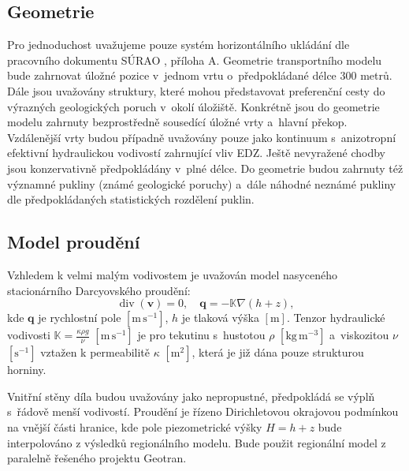 \documentclass{article}
\def\unit#1{\mathrm{#1}}
\def\grad{\nabla}
\def\div{\operatorname{div}}
\def\vc#1{\mathbf{\boldsymbol{#1}}}     %
\def\tn#1{{\mathbb{#1}}}    %
\begin{document}

\subsection{Geometrie}
\label{sec:transport_geometrie}
 Pro jednoduchost uvažujeme pouze systém horizontálního ukládání dle pracovního dokumentu SÚRAO , příloha A. 
 Geometrie transportního modelu bude zahrnovat úložné pozice v~jednom vrtu o~předpokládané délce 300 metrů. 
 Dále jsou uvažovány  struktury, které mohou představovat preferenční cesty do výrazných geologických poruch v~okolí úložiště. 
 Konkrétně jsou do geometrie modelu zahrnuty bezprostředně sousedící úložné vrty a~hlavní překop. Vzdálenější vrty budou případně 
 uvažovány pouze jako kontinuum s~anizotropní efektivní hydraulickou vodivostí zahrnující vliv EDZ. 
Ještě nevyražené chodby jsou konzervativně předpokládány v~plné délce. Do geometrie budou zahrnuty též významné pukliny 
(známé geologické poruchy) a~dále náhodné neznámé pukliny dle předpokládaných statistických rozdělení puklin.


\subsection{Model proudění}
\label{sec:transport_flow}
Vzhledem k velmi malým vodivostem je uvažován model nasyceného stacionárního Darcyovského proudění:
\[
    \div(\vc v) = 0, \quad \vc q = -\tn K \grad (h + z),
\]
kde $\vc q$ je rychlostní pole $[\unit{m\,s^{-1}}]$, $h$ je tlaková výška $[\unit{m}]$. Tenzor hydraulické vodivosti $\tn K =\frac{\kappa \rho g}{\nu}$
 $[\unit{m\,s^{-1}}]$ je pro tekutinu s~hustotou $\rho$ $[\unit{kg\, m^{-3}}]$ a~viskozitou $\nu$ $[\unit{s^{-1}}]$ vztažen k permeabilitě $\kappa$ $[\unit{m^2}]$, která je již dána pouze strukturou horniny.

Vnitřní stěny díla budou uvažovány jako nepropustné, předpokládá se výplň s~řádově menší vodivostí. 
Proudění je řízeno Dirichletovou okrajovou podmínkou na vnější části hranice, kde pole piezometrické výšky $H = h + z$ 
bude interpolováno z výsledků regionálního modelu. Bude použit regionální model z paralelně řešeného projektu Geotran.
\end{document}
